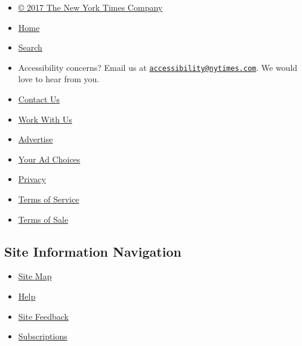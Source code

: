 \begin{itemize}
\tightlist
\item
  \href{https://www.nytimes.com/content/help/rights/copyright/copyright-notice.html}{©
  2017 The New York Times Company}
\item
  \href{https://www.nytimes.com}{Home}
\item
  \href{https://query.nytimes.com/search/sitesearch/\#/}{Search}
\item
  Accessibility concerns? Email us at
  \href{mailto:accessibility@nytimes.com}{\nolinkurl{accessibility@nytimes.com}}.
  We would love to hear from you.
\item
  \href{https://www.nytimes.com/ref/membercenter/help/infoservdirectory.html}{Contact
  Us}
\item
  \href{http://www.nytco.com/careers}{Work With Us}
\item
  \href{http://nytmediakit.com/}{Advertise}
\item
  \href{https://www.nytimes.com/content/help/rights/privacy/policy/privacy-policy.html\#pp}{Your
  Ad Choices}
\item
  \href{https://www.nytimes.com/privacy}{Privacy}
\item
  \href{https://www.nytimes.com/ref/membercenter/help/agree.html}{Terms
  of Service}
\item
  \href{https://www.nytimes.com/content/help/rights/sale/terms-of-sale.html}{Terms
  of Sale}
\end{itemize}

\hypertarget{site-information-navigation-1}{%
\subsection{Site Information
Navigation}\label{site-information-navigation-1}}

\begin{itemize}
\tightlist
\item
  \href{http://spiderbites.nytimes.com/}{Site Map}
\item
  \href{https://www.nytimes.com/membercenter/sitehelp.html}{Help}
\item
  \href{https://myaccount.nytimes.com/membercenter/feedback.html}{Site
  Feedback}
\item
  \href{https://www.nytimes.com/subscriptions/Multiproduct/lp5558.html?campaignId=37WXW}{Subscriptions}
\end{itemize}
